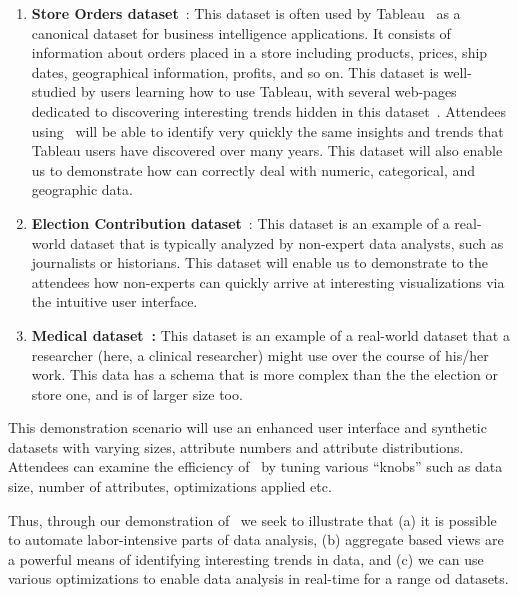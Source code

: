 \begin{enumerate}
  \item {\bf Store Orders dataset}~\cite{superstore}: This dataset is
    often used by Tableau~\cite{tableau} as a canonical dataset for
    business intelligence applications. It consists of information
    about orders placed in a store including products, prices, ship
    dates, geographical information, profits, and so on. This dataset
    is well-studied by users learning how to use Tableau, with several
    web-pages dedicated to discovering interesting trends hidden in
    this dataset~\cite{website}. Attendees using \SeeDB\ will be able
    to identify very quickly the same insights and trends that Tableau
    users have discovered over many years. This dataset will also
    enable us to demonstrate how \SeeDB can correctly deal with
    numeric, categorical, and geographic data.
  \item {\bf Election Contribution dataset}~\cite{election_data}: This dataset
  is an example of a real-world dataset that is typically analyzed by
    non-expert data analysts, such as journalists or historians. This
    dataset will enable us to demonstrate to the attendees how
    non-experts can quickly arrive at interesting visualizations via
    the intuitive user interface.
  \item {\bf Medical dataset~\cite{mimic}:} This dataset is an example of a
    real-world dataset that a researcher (here, a clinical researcher)
    might use over the course of his/her work. This data has a schema
    that is more complex than the the election or store one, and is of
    larger size too.  
\end{enumerate}

 This demonstration
scenario will use an enhanced user interface and synthetic datasets with varying
sizes, attribute numbers and attribute distributions. Attendees can examine the
efficiency of \SeeDB\ by tuning various ``knobs'' such as data size, number of
attributes, optimizations applied etc.

Thus, through our demonstration of \SeeDB\, we seek to illustrate that (a) it is
possible to automate labor-intensive parts of data analysis, (b) aggregate based
views are a powerful means of identifying interesting trends in data, and (c) we
can use various optimizations to enable data analysis in real-time for a range
od datasets.

